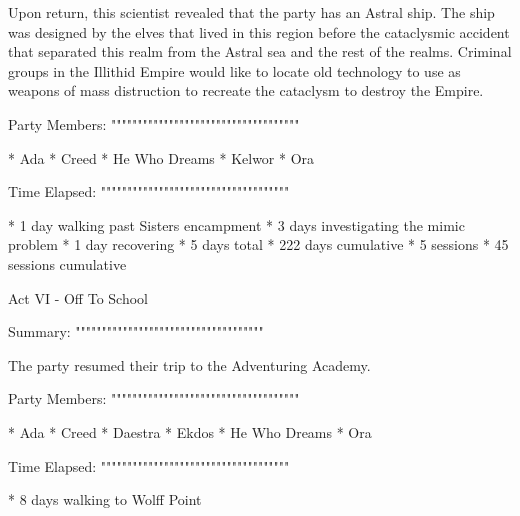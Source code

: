 Upon return, this scientist revealed that the party has an Astral ship.
The ship was designed by the elves that lived in this region before the cataclysmic accident that separated this realm from the Astral sea and the rest of the realms.
Criminal groups in the Illithid Empire would like to locate old technology to use as weapons of mass distruction to recreate the cataclysm to destroy the Empire.

Party Members:
""""""""""""""""""""""""""""""""""""

  * Ada
  * Creed
  * He Who Dreams
  * Kelwor
  * Ora

Time Elapsed:
""""""""""""""""""""""""""""""""""""

  * 1 day walking past Sisters encampment
  * 3 days investigating the mimic problem
  * 1 day recovering
  * 5 days total
  * 222 days cumulative
  * 5 sessions
  * 45 sessions cumulative

Act VI - Off To School
^^^^^^^^^^^^^^^^^^^^^^^^^^^^^^^^^^^^

Summary:
""""""""""""""""""""""""""""""""""""

The party resumed their trip to the Adventuring Academy.

Party Members:
""""""""""""""""""""""""""""""""""""

  * Ada
  * Creed
  * Daestra
  * Ekdos
  * He Who Dreams
  * Ora

Time Elapsed:
""""""""""""""""""""""""""""""""""""

  * 8 days walking to Wolff Point